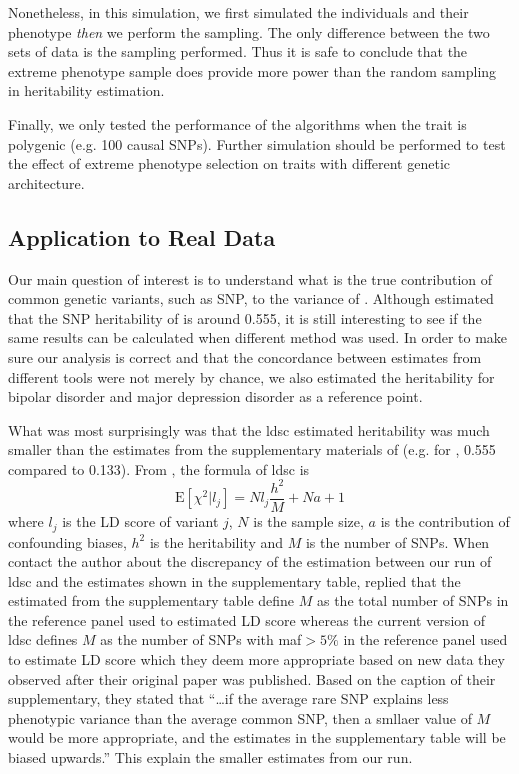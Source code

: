 	Nonetheless, in this simulation, we first simulated the individuals and their phenotype \emph{then} we perform the sampling.
	The only difference between the two sets of data is the sampling performed.
	Thus it is safe to conclude that the extreme phenotype sample does provide more power than the random sampling in heritability estimation.
		
	Finally, we only tested the performance of the algorithms when the trait is polygenic (e.g. 100 causal \glspl{SNP}).
	Further simulation should be performed to test the effect of extreme phenotype selection on traits with different genetic architecture. 
	
	\subsection{Application to Real Data}
	Our main question of interest is to understand what is the true contribution of common genetic variants, such as \gls{SNP}, to the variance of .
	Although \citet{Bulik-Sullivan2015c} estimated that the \gls{SNP} heritability of  is around 0.555, it is still interesting to see if the same results can be calculated when different method was used. 
	In order to make sure our analysis is correct and that the concordance between estimates from different tools were not merely by chance, we also estimated the heritability for bipolar disorder and major depression disorder as a reference point.
	
	What was most surprisingly was that the \gls{ldsc} estimated heritability was much smaller than the estimates from the supplementary materials of \citet{Bulik-Sullivan2015} (e.g. for , 0.555 compared to 0.133).
	From \citet{Bulik-Sullivan2015}, the formula of \gls{ldsc} is
	\begin{equation}
		\mathrm{E}[\chi^2|l_j] = Nl_j\frac{h^2}{M}+Na+1
	\end{equation}
	where $l_j$ is the \gls{LD} score of variant $j$, $N$ is the sample size, $a$ is the contribution of confounding biases, $h^2$ is the heritability and $M$ is the number of \glspl{SNP}.
	When contact the author about the discrepancy of the estimation between our run of \gls{ldsc} and the estimates shown in the supplementary table, \citet{Bulik-Sullivan2015c} replied that the estimated from the supplementary table define $M$ as the total number of \glspl{SNP} in the reference panel used to estimated \gls{LD} score whereas the current version of \gls{ldsc} defines $M$ as the number of \glspl{SNP} with \gls{maf}$ >5\%$ in the reference panel used to estimate \gls{LD} score which they deem more appropriate based on new data they observed after their original paper was published.
	Based on the caption of their supplementary, they stated that ``\dots if the average rare \gls{SNP} explains less phenotypic variance than the average common \gls{SNP}, then a smllaer value of $M$ would be more appropriate, and the estimates in the supplementary table will be biased upwards.''
	This explain the smaller estimates from our run. 
	

